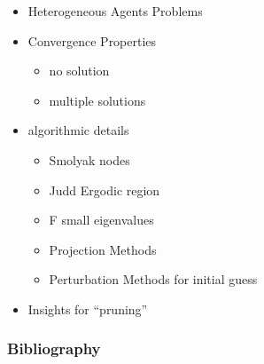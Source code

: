 \documentclass[tikz]{beamer}
\begin{document}
\begin{frame}
\begin{itemize}
  \item Heterogeneous Agents Problems
  \item Convergence Properties
    \begin{itemize}
    \item no solution
    \item multiple solutions
    \end{itemize}
\item algorithmic details
  \begin{itemize}
 \item Smolyak nodes
 \item Judd Ergodic region
 \item F small eigenvalues
 \item Projection Methods
 \item Perturbation Methods for initial guess
  \end{itemize}
\item Insights for ``pruning''
  \end{itemize}
\end{frame}

\begin{frame}
  \frametitle{Bibliography}
  


\end{frame}

\appendix
\end{document}
